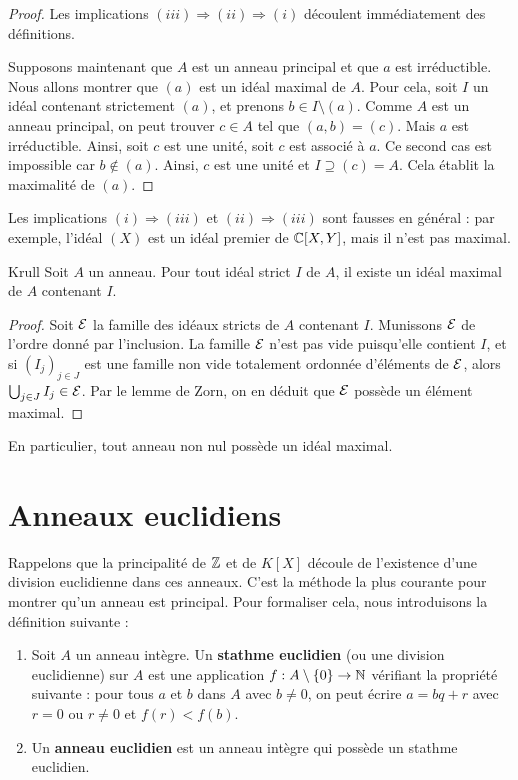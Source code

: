 \documentclass[]{report}
\begin{document}
\begin{proof}
    Les implications $(iii) \Rightarrow (ii) \Rightarrow (i)$ découlent immédiatement des définitions.

    Supposons maintenant que $A$ est un anneau principal et que $a$ est irréductible. Nous allons montrer que $(a)$ est un idéal maximal de $A$. Pour cela, soit $I$ un idéal contenant strictement $(a)$, et prenons $b \in I \setminus (a)$. Comme $A$ est un anneau principal, on peut trouver $c \in A$ tel que $(a, b) = (c)$. Mais $a$ est irréductible. Ainsi, soit $c$ est une unité, soit $c$ est associé à $a$. Ce second cas est impossible car $b \notin (a)$. Ainsi, $c$ est une unité et $I \supseteq (c) = A$. Cela établit la maximalité de $(a)$.
\end{proof}

\begin{re}{}{}
    Les implications $(i) \Rightarrow (iii)$ et $(ii) \Rightarrow (iii)$ sont fausses en général : par exemple, l'idéal $(X)$ est un idéal premier de $\mathbb{C}[X, Y]$, mais il n'est pas maximal.
\end{re}

\begin{tm}{Krull}{}
    Soit $A$ un anneau. Pour tout idéal strict $I$ de $A$, il existe un idéal maximal de $A$ contenant $I$.
\end{tm}

\begin{proof}
    Soit $\mathcal{E}$ la famille des idéaux stricts de $A$ contenant $I$. Munissons $\mathcal{E}$ de l'ordre donné par l'inclusion. La famille $\mathcal{E}$ n'est pas vide puisqu'elle contient $I$, et si $(I_j)_{j \in J}$ est une famille non vide totalement ordonnée d'éléments de $\mathcal{E}$, alors $\bigcup_{j \in J} I_j \in \mathcal{E}$. Par le lemme de Zorn, on en déduit que $\mathcal{E}$ possède un élément maximal.
\end{proof}

En particulier, tout anneau non nul possède un idéal maximal.

\section{Anneaux euclidiens}

Rappelons que la principalité de $\mathbb{Z}$ et de $K[X]$ découle de l'existence d'une division euclidienne dans ces anneaux. C'est la méthode la plus courante pour montrer qu'un anneau est principal. Pour formaliser cela, nous introduisons la définition suivante :

\begin{df}{}{}
    \begin{enumerate}
        \item Soit $A$ un anneau intègre. Un \textbf{stathme euclidien} (ou une division euclidienne) sur $A$ est une application $f : A \setminus \{0\} \to \mathbb{N}$ vérifiant la propriété suivante : pour tous $a$ et $b$ dans $A$ avec $b \neq 0$, on peut écrire $a = bq + r$ avec $r = 0$ ou $r \neq 0$ et $f(r) < f(b)$.
        \item Un \textbf{anneau euclidien} est un anneau intègre qui possède un stathme euclidien.
    \end{enumerate}
\end{df}
\end{document}
